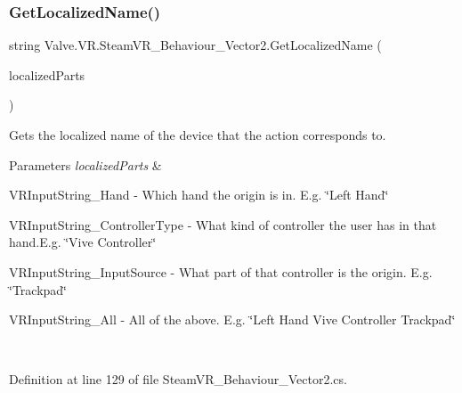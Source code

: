 \mbox{\label{class_valve_1_1_v_r_1_1_steam_v_r___behaviour___vector2_ab942ef39b26358192fee5466d7e99ab6}} 
\subsubsection{\texorpdfstring{GetLocalizedName()}{GetLocalizedName()}}
{\footnotesize\ttfamily string Valve.\+V\+R.\+Steam\+V\+R\+\_\+\+Behaviour\+\_\+\+Vector2.\+Get\+Localized\+Name (\begin{DoxyParamCaption}\item[{params \mbox{\hyperlink{namespace_valve_1_1_v_r_a05e76187bbc5846b9bfb44f6acf13912}{E\+V\+R\+Input\+String\+Bits}} \mbox{[}$\,$\mbox{]}}]{localized\+Parts }\end{DoxyParamCaption})}



Gets the localized name of the device that the action corresponds to. 


\begin{DoxyParams}{Parameters}
{\em localized\+Parts} & 
\begin{DoxyItemize}
\item V\+R\+Input\+String\+\_\+\+Hand -\/ Which hand the origin is in. E.\+g. \char`\"{}\+Left Hand\char`\"{} 
\item V\+R\+Input\+String\+\_\+\+Controller\+Type -\/ What kind of controller the user has in that hand.\+E.\+g. \char`\"{}\+Vive Controller\char`\"{} 
\item V\+R\+Input\+String\+\_\+\+Input\+Source -\/ What part of that controller is the origin. E.\+g. \char`\"{}\+Trackpad\char`\"{} 
\item V\+R\+Input\+String\+\_\+\+All -\/ All of the above. E.\+g. \char`\"{}\+Left Hand Vive Controller Trackpad\char`\"{} 
\end{DoxyItemize}\\
\hline
\end{DoxyParams}


Definition at line 129 of file Steam\+V\+R\+\_\+\+Behaviour\+\_\+\+Vector2.\+cs.

\mbox{\label{class_valve_1_1_v_r_1_1_steam_v_r___behaviour___vector2_ab0cff6e0797561b567e3975d66760509}} 
